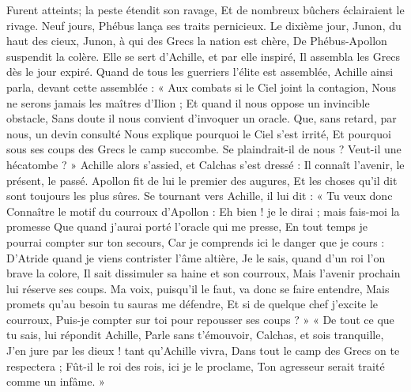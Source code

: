 \documentclass{article}
\begin{document}
{{Furent atteints; la peste étendit son ravage,
Et de nombreux bûchers éclairaient le rivage.
Neuf jours, Phébus lança ses traits pernicieux.
Le dixième jour, Junon, du haut des cieux,
Junon, à qui des Grecs la nation est chère,
De Phébus-Apollon suspendit la colère.
Elle se sert d'Achille, et par elle inspiré,
Il assembla les Grecs dès le jour expiré.
Quand de tous les guerriers l'élite est assemblée,
Achille ainsi parla, devant cette assemblée :
« Aux combats si le Ciel joint la contagion,
Nous ne serons jamais les maîtres d'Ilion ;
Et quand il nous oppose un invincible obstacle,
Sans doute il nous convient d'invoquer un oracle.
Que, sans retard, par nous, un devin consulté
Nous explique pourquoi le Ciel s'est irrité,
Et pourquoi sous ses coups des Grecs le camp succombe.
Se plaindrait-il de nous ? Veut-il une hécatombe ? »
Achille alors s'assied, et Calchas s'est dressé :
Il connaît l'avenir, le présent, le passé.
Apollon fit de lui le premier des augures,
Et les choses qu'il dit sont toujours les plus sûres.
Se tournant vers Achille, il lui dit : « Tu veux donc
Connaître le motif du courroux d'Apollon :
Eh bien ! je le dirai ; mais fais-moi la promesse
Que quand j'aurai porté l'oracle qui me presse,
En tout temps je pourrai compter sur ton secours,
Car je comprends ici le danger que je cours :
D'Atride quand je viens contrister l’âme altière,
Je le sais, quand d'un roi l'on brave la colore,
Il sait dissimuler sa haine et son courroux,
Mais l'avenir prochain  lui réserve ses coups.
Ma voix, puisqu'il le faut, va donc se faire entendre,
Mais promets qu'au besoin tu sauras me défendre,
Et si de quelque chef j'excite le courroux,
Puis-je compter sur toi pour repousser ses coups ? »
« De tout ce que tu sais, lui répondit Achille,
Parle sans t'émouvoir, Calchas, et sois tranquille,
J'en jure par les dieux ! tant qu'Achille vivra,
Dans tout le camp des Grecs on te respectera ;
Fût-il le roi des rois, ici je le proclame,
Ton agresseur serait traité comme un infâme. »}}

\pend
\endnumbering
\end{document}
